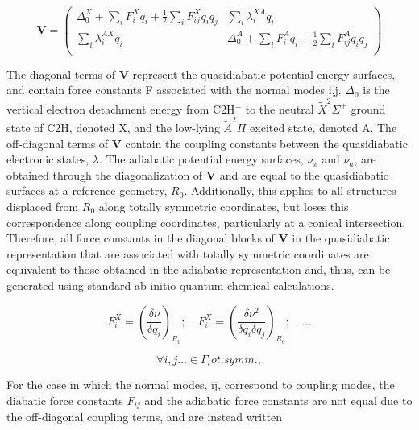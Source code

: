 \documentclass[journal=jpcafh,manuscript=article,layout=onecolumn, 12pt]{achemso}
\begin{document}
\begin{equation*}
\boldsymbol{V} = 
\begin{pmatrix}
\Delta_0^X + \sum\limits_i F^{X}_{i}q_{i} + \frac{1}{2}\sum\limits_i F^{X}_{ij}q_{i}q_{j}  &
\sum\limits_i \lambda_{i}^{XA}q_{i} \\
\sum\limits_i \lambda_{i}^{AX}q_{i} &
\Delta_0^A + \sum\limits_i F^{A}_{i}q_{i} + \frac{1}{2}\sum\limits_i F^{A}_{ij}q_{i}q_{j} \\  
\end{pmatrix}
\end{equation*}

The diagonal terms of $\boldsymbol{V}$ represent the quasidiabatic potential energy surfaces, and contain force constants F associated with the normal modes i,j. $\Delta_0$ is the vertical electron detachment energy from C2H$^-$ to the neutral $\tilde{X}^2\Sigma^+$ ground state of C2H, denoted X, and the low-lying $\tilde{A}^2\Pi$ excited state, denoted A.  
The off-diagonal terms of $\boldsymbol{V}$ contain the coupling constants between the quasidiabatic electronic states, $\lambda$.
The adiabatic potential energy surfaces, $\nu_x$ and $\nu_a$, are obtained through the diagonalization of $\boldsymbol{V}$ and are equal to the quasidiabatic surfaces at a reference geometry, $R_0$. Additionally, this applies to all structures displaced from $R_0$ along totally symmetric coordinates, but loses this correspondence along coupling coordinates, particularly at a conical intersection. 
Therefore, all force constants in the diagonal blocks of $\boldsymbol{V}$ in the quasidiabatic representation that are associated with totally symmetric coordinates are equivalent to those obtained in the adiabatic representation and, thus, can be generated using standard ab initio quantum-chemical calculations.


\begin{equation*}
F^X_i = \left(\frac{\delta\nu}{\delta q_i}\right)_{R_0} ; \quad F^X_i = \left(\frac{\delta\nu^2}{\delta q_i\delta q_j}\right)_{R_0} ;\quad ...
\end{equation*}

\begin{equation*}
\forall i,j...\in\Gamma{_tot.symm.},
\end{equation*}

For the case in which the normal modes, ij, correspond to coupling modes, the diabatic force constants $F_{ij}$ and the adiabatic force constants are not equal due to the off-diagonal coupling terms, and are instead written
\end{document}

